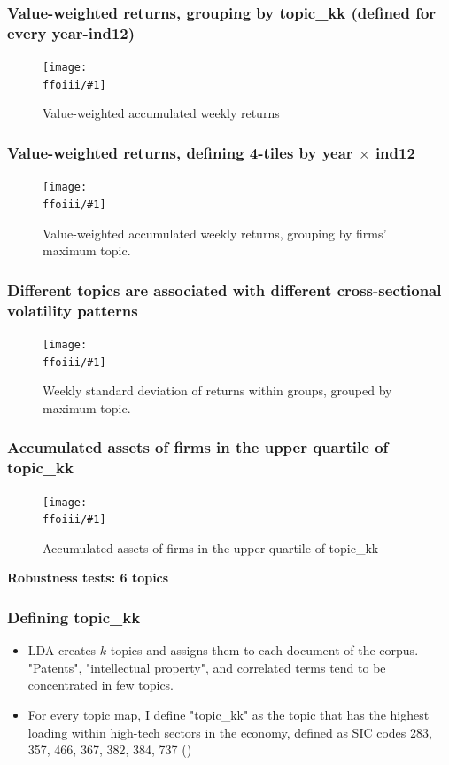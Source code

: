 \documentclass{beamer}
\newcommand{\ffoiii}{dicfullmc10thr10defnob5noa0_8_3t}
\newcommand{\ffovi}{dicfullmc10thr10defnob5noa0_8_6t}
\newcommand{\insertfigureiii}[2]{
\begin{figure}[h!]
  \centering
  \texttt{[image: \\ffoiii/\#1]}
  \centering
  \captionsetup{font=scriptsize}
  \caption{#2}
  \label{fig:#1}
\end{figure}
}
\begin{document}
\begin{frame}
\frametitle{Value-weighted returns, grouping by topic\_kk (defined for every year-ind12)}
\insertfigureiii{awawr_aggind}{Value-weighted accumulated weekly returns}
\end{frame}

\begin{frame}
\frametitle{Value-weighted returns, defining 4-tiles by year $\times$ ind12}
\insertfigureiii{awawr_byg}{Value-weighted accumulated weekly returns, grouping by firms' maximum topic.}
\end{frame}

\begin{frame}
\frametitle{Different topics are associated with different cross-sectional volatility patterns}
\insertfigureiii{wsdr_byg}{Weekly standard deviation of returns within groups, grouped by maximum topic.}
\end{frame}

\begin{frame}
\frametitle{Accumulated assets of firms in the upper quartile of topic\_kk}
\insertfigureiii{stackedplot_at}{Accumulated assets of firms in the upper quartile of topic\_kk}
\end{frame}


\begin{frame}
\label{robsix}
\centering
\huge\bfseries Robustness tests: 6 topics
\hyperlink{results}{}
\end{frame}

\begin{frame}
  \frametitle{Defining topic\_kk}
  \begin{itemize}
  \item LDA creates $k$ topics and assigns them to each document of the corpus. "Patents", "intellectual property", and correlated terms tend to be concentrated in few topics.
  \item For every topic map, I define "topic\_kk" as the topic that has the highest loading within high-tech sectors in the economy, defined as SIC codes 283, 357, 466, 367, 382, 384, 737 (\cite{Brown2009-zp}) 
  \tiny
  
\end{itemize}

\end{frame}
\end{document}
